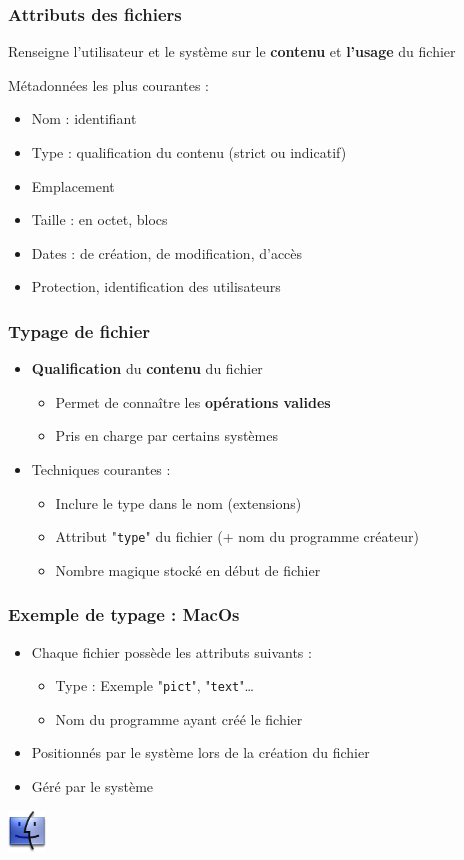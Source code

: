 \begin{frame}
\frametitle{Attributs des fichiers}
Renseigne l'utilisateur et le système sur le \textbf{contenu} et \textbf{l'usage} du fichier

Métadonnées les plus courantes :
\begin{itemize}
\item Nom : identifiant
\item Type : qualification du contenu (strict ou indicatif)
\item Emplacement
\item Taille : en octet, blocs
\item Dates : de création, de modification, d'accès
\item Protection, identification des utilisateurs
\end{itemize}
\end{frame}


\begin{frame}
\frametitle{Typage de fichier}
\begin{itemize}
\item \textbf{Qualification} du \textbf{contenu} du fichier
\begin{itemize}
\item Permet de connaître les \textbf{opérations valides}
\item Pris en charge par certains systèmes
\end{itemize}
\item Techniques courantes :
\begin{itemize}
\item Inclure le type dans le nom (extensions)
\item Attribut "\texttt{type}" du fichier (+ nom du programme créateur)
\item Nombre magique stocké en début de fichier
\end{itemize}
\end{itemize}
\end{frame}

\begin{frame}
\frametitle{Exemple de typage : \textbf{MacOs}}
\begin{itemize}
\item Chaque fichier possède les attributs suivants :
\begin{itemize}
\item Type : Exemple "\texttt{pict}", "\texttt{text}"…
\item Nom du programme ayant créé le fichier
\end{itemize}
\item Positionnés par le système lors de la création du fichier
\item Géré par le système
\end{itemize}
\includegraphics[width=1cm]{../illustration/logo_macos.png}
\end{frame}


